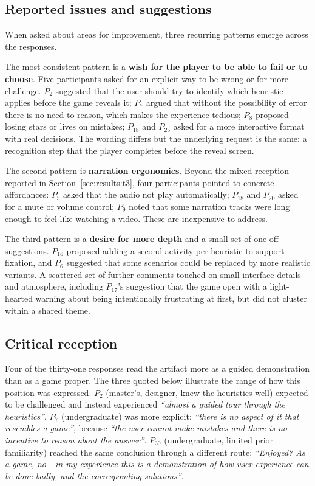 \subsection{Reported issues and suggestions}
\label{sec:results:t4}

When asked about areas for improvement, three recurring patterns emerge across the responses.

The most consistent pattern is a \textbf{wish for the player to be able to fail or to choose}. Five participants asked for an explicit way to be wrong or for more challenge. $P_2$ suggested that the user should try to identify which heuristic applies before the game reveals it; $P_7$ argued that without the possibility of error there is no need to reason, which makes the experience tedious; $P_8$ proposed losing stars or lives on mistakes; $P_{18}$ and $P_{25}$ asked for a more interactive format with real decisions. The wording differs but the underlying request is the same: a recognition step that the player completes before the reveal screen.

The second pattern is \textbf{narration ergonomics}. Beyond the mixed reception reported in Section~\ref{sec:results:t3}, four participants pointed to concrete affordances: $P_5$ asked that the audio not play automatically; $P_{18}$ and $P_{20}$ asked for a mute or volume control; $P_9$ noted that some narration tracks were long enough to feel like watching a video. These are inexpensive to address.

The third pattern is a \textbf{desire for more depth} and a small set of one-off suggestions. $P_{16}$ proposed adding a second activity per heuristic to support fixation, and $P_6$ suggested that some scenarios could be replaced by more realistic variants. A scattered set of further comments touched on small interface details and atmosphere, including $P_{17}$'s suggestion that the game open with a light-hearted warning about being intentionally frustrating at first, but did not cluster within a shared theme.

\subsection{Critical reception}
\label{sec:results:t6}

Four of the thirty-one responses read the artifact more as a guided demonstration than as a game proper. The three quoted below illustrate the range of how this position was expressed. $P_2$ (master's, designer, knew the heuristics well) expected to be challenged and instead experienced \textit{``almost a guided tour through the heuristics''}. $P_7$ (undergraduate) was more explicit: \textit{``there is no aspect of it that resembles a game''}, because \textit{``the user cannot make mistakes and there is no incentive to reason about the answer''}. $P_{30}$ (undergraduate, limited prior familiarity) reached the same conclusion through a different route: \textit{``Enjoyed? As a game, no - in my experience this is a demonstration of how user experience can be done badly, and the corresponding solutions''}.

